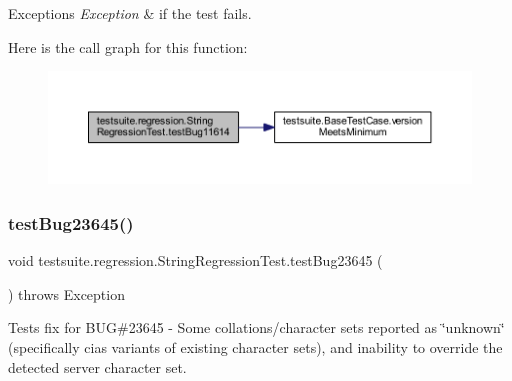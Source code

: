 \begin{DoxyExceptions}{Exceptions}
{\em Exception} & if the test fails. \\
\hline
\end{DoxyExceptions}
Here is the call graph for this function\+:
\nopagebreak
\begin{figure}[H]
\begin{center}
\leavevmode
\includegraphics[width=350pt]{classtestsuite_1_1regression_1_1_string_regression_test_a06cd6f2ea6096ebef7516e5ed1ff3659_cgraph}
\end{center}
\end{figure}
\mbox{\label{classtestsuite_1_1regression_1_1_string_regression_test_a0b910fb41d304e6b938f8908dfffe0bf}} 
\subsubsection{\texorpdfstring{test\+Bug23645()}{testBug23645()}}
{\footnotesize\ttfamily void testsuite.\+regression.\+String\+Regression\+Test.\+test\+Bug23645 (\begin{DoxyParamCaption}{ }\end{DoxyParamCaption}) throws Exception}

Tests fix for B\+UG\#23645 -\/ Some collations/character sets reported as \char`\"{}unknown\char`\"{} (specifically cias variants of existing character sets), and inability to override the detected server character set.



